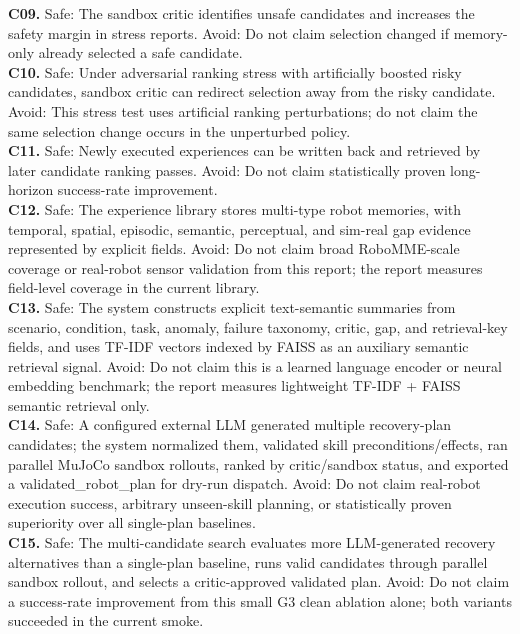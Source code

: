 \noindent\textbf{C09.} Safe: The sandbox critic identifies unsafe candidates and increases the safety margin in stress reports. Avoid: Do not claim selection changed if memory-only already selected a safe candidate.\\
\noindent\textbf{C10.} Safe: Under adversarial ranking stress with artificially boosted risky candidates, sandbox critic can redirect selection away from the risky candidate. Avoid: This stress test uses artificial ranking perturbations; do not claim the same selection change occurs in the unperturbed policy.\\
\noindent\textbf{C11.} Safe: Newly executed experiences can be written back and retrieved by later candidate ranking passes. Avoid: Do not claim statistically proven long-horizon success-rate improvement.\\
\noindent\textbf{C12.} Safe: The experience library stores multi-type robot memories, with temporal, spatial, episodic, semantic, perceptual, and sim-real gap evidence represented by explicit fields. Avoid: Do not claim broad RoboMME-scale coverage or real-robot sensor validation from this report; the report measures field-level coverage in the current library.\\
\noindent\textbf{C13.} Safe: The system constructs explicit text-semantic summaries from scenario, condition, task, anomaly, failure taxonomy, critic, gap, and retrieval-key fields, and uses TF-IDF vectors indexed by FAISS as an auxiliary semantic retrieval signal. Avoid: Do not claim this is a learned language encoder or neural embedding benchmark; the report measures lightweight TF-IDF + FAISS semantic retrieval only.\\
\noindent\textbf{C14.} Safe: A configured external LLM generated multiple recovery-plan candidates; the system normalized them, validated skill preconditions/effects, ran parallel MuJoCo sandbox rollouts, ranked by critic/sandbox status, and exported a validated\_robot\_plan for dry-run dispatch. Avoid: Do not claim real-robot execution success, arbitrary unseen-skill planning, or statistically proven superiority over all single-plan baselines.\\
\noindent\textbf{C15.} Safe: The multi-candidate search evaluates more LLM-generated recovery alternatives than a single-plan baseline, runs valid candidates through parallel sandbox rollout, and selects a critic-approved validated plan. Avoid: Do not claim a success-rate improvement from this small G3 clean ablation alone; both variants succeeded in the current smoke.\\

